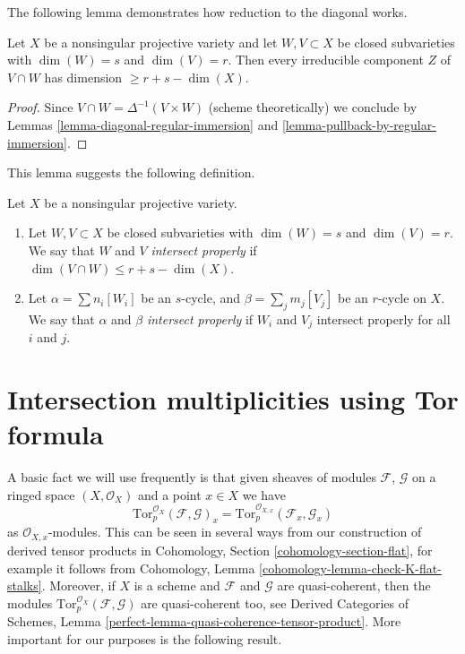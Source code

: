 \noindent
The following lemma demonstrates how reduction to the diagonal works.

\begin{lemma}
\label{lemma-intersect-in-smooth}
Let $X$ be a nonsingular projective variety and let $W,V \subset X$
be closed subvarieties with $\dim(W) = s$ and $\dim(V) = r$. Then every
irreducible component $Z$ of $V \cap W$ has dimension $\geq r + s - \dim(X)$.
\end{lemma}

\begin{proof}
Since $V \cap W = \Delta^{-1}(V \times W)$ (scheme theoretically)
we conclude by Lemmas \ref{lemma-diagonal-regular-immersion} and
\ref{lemma-pullback-by-regular-immersion}.
\end{proof}

\noindent
This lemma suggests the following definition.

\begin{definition}
\label{definition-proper-intersection}
Let $X$ be a nonsingular projective variety.
\begin{enumerate}
\item Let $W,V \subset X$ be closed subvarieties with
$\dim(W) = s$ and $\dim(V) = r$. We say that $W$ and $V$
{\it intersect properly} if $\dim(V \cap W) \leq r + s - \dim(X)$.
\item Let $\alpha = \sum n_i [W_i]$ be an $s$-cycle,
and $\beta = \sum_j m_j [V_j]$ be an $r$-cycle on $X$. We say
that $\alpha$ and $\beta$ {\it intersect properly} if
$W_i$ and $V_j$ intersect properly for all $i$ and $j$.
\end{enumerate}
\end{definition}


\section{Intersection multiplicities using Tor formula}
\label{section-tor-formula}

\noindent
A basic fact we will use frequently is that given sheaves of
modules $\mathcal{F}$, $\mathcal{G}$ on a ringed space $(X, \mathcal{O}_X)$
and a point $x \in X$ we have
$$
\text{Tor}_p^{\mathcal{O}_X}(\mathcal{F}, \mathcal{G})_x =
\text{Tor}_p^{\mathcal{O}_{X, x}}(\mathcal{F}_x, \mathcal{G}_x)
$$
as $\mathcal{O}_{X, x}$-modules. This can be seen in several ways
from our construction of derived tensor products in
Cohomology, Section \ref{cohomology-section-flat}, for example it follows from
Cohomology, Lemma \ref{cohomology-lemma-check-K-flat-stalks}.
Moreover, if $X$ is a scheme and $\mathcal{F}$ and $\mathcal{G}$
are quasi-coherent, then the modules
$\text{Tor}_p^{\mathcal{O}_X}(\mathcal{F}, \mathcal{G})$ are
quasi-coherent too, see
Derived Categories of Schemes, Lemma
\ref{perfect-lemma-quasi-coherence-tensor-product}.
More important for our purposes is the following result.

